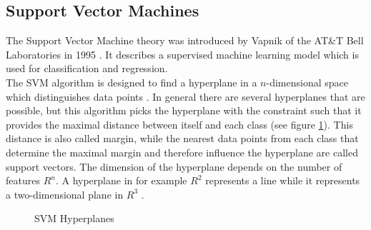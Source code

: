 \documentclass[
	ngerman,
	ruledheaders=section,%
	class=report,%
	thesis={type=master},%
	accentcolor=8c,%
	custommargins=false,%
	marginpar=false,%
	parskip=half-,%
	fontsize=11pt,%
]{tudapub}
\begin{document}
\subsection{Support Vector Machines}
The Support Vector Machine theory was introduced by Vapnik of the AT\&T Bell Laboratories in 1995 \cite{vapnik1995t}. It describes a supervised machine learning model which is used for classification and regression.\\
The SVM algorithm is designed to find a hyperplane in a $n$-dimensional space which distinguishes data points \cite{awad2015efficient}. In general there are several hyperplanes that are possible, but this algorithm picks the hyperplane with the constraint such that it provides the maximal distance between itself and each class (see figure \ref{fig:svm}). This distance is also called margin, while the nearest data points from each class that determine the maximal margin and therefore influence the hyperplane are called support vectors. The dimension of the hyperplane depends on the number of features $R^{n}$. A hyperplane in for example $R^{2}$ represents a line while it represents a two-dimensional plane in $R^{3}$ \cite{awad2015efficient}.\\
\begin{figure}[hp]%
    \centering
    \qquad
    \caption{SVM Hyperplanes \cite{lin2017research}}%
    \label{fig:svm}%
\end{figure}
\end{document}
